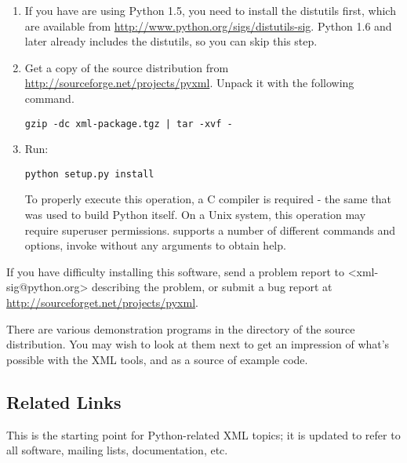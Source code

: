 \documentclass{howto}
\begin{document}
\begin{enumerate}
\item If you have are using Python 1.5, you need to install the
distutils first, which are available from
\url{http://www.python.org/sigs/distutils-sig}. Python 1.6 and later
already includes the distutils, so you can skip this step.

\item Get a copy of the source distribution from
\url{http://sourceforge.net/projects/pyxml}.  Unpack it with the
following command.

\begin{verbatim}
gzip -dc xml-package.tgz | tar -xvf -
\end{verbatim}

\item
 Run:
\begin{verbatim}
python setup.py install
\end{verbatim}

To properly execute this operation, a C compiler is required - the
same that was used to build Python itself. On a Unix system, this
operation may require superuser permissions.  supports
a number of different commands and options, invoke 
without any arguments to obtain help.

\end{enumerate}

If you have difficulty installing this software, send a problem report
to <xml-sig@python.org> describing the problem, or submit a bug report
at \url{http://sourceforget.net/projects/pyxml}.

There are various demonstration programs in the  directory
of the source distribution.  You may wish to look at them next to get
an impression of what's possible with the XML tools, and as a source
of example code.


\subsection{Related Links}

\begin{definitions}
%
This is the starting point for Python-related XML topics; it is
updated to refer to all software, mailing lists, documentation, etc. 

\end{definitions}
\end{document}
